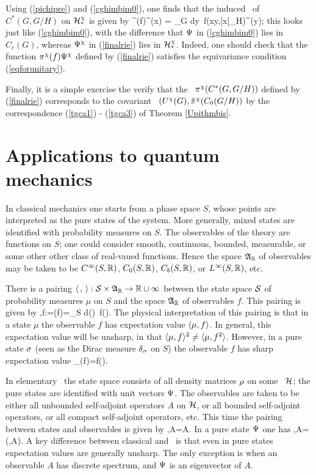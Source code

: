 Using (\ref{pichipre}) and (\ref{cghimbim0}), one finds that the induced \rep\ of
$C^*(G,G/H)$ on ${\cal H}_*^{\chi}$ is given by
\be
\pi^{\ch}(f)\Ps^{\ch}(x)  =  \int_G dy\, f(xy\inv,[x]_H)\Ps^{\ch}(y);  
 \ee
this looks just like (\ref{cghimbim0}), with the difference that $\Psi$ in 
(\ref{cghimbim0}) lies in $C_c(G)$, whereas $\Psi^{\chi}$ in (\ref{finalrie}) lies in
${\cal H}_*^{\chi}$. Indeed, one should check that the function $\pi^{\chi}(f)\Psi^{\chi}$ defined by
(\ref{finalrie})  satisfies the equivariance condition (\ref{eqforunitary}).

Finally, it is a simple exercise the verify that the \rep\ $\pi^{\chi}(C^*(G,G/H))$ defined
by (\ref{finalrie}) corresponds to the covariant \rep\ $(U^{\chi}(G),\tilde{\pi}^{\chi}(C_0(G/H))$
by the correspondence (\ref{tgca1}) - (\ref{tgca3}) of Theorem \ref{Upithmbis}.
\enp
\section{Applications to quantum mechanics}
  In classical mechanics one starts from a phase
space $S$, whose points are interpreted as the pure states of the
system. More generally, mixed states are identified with probability
measures on $S$. The observables of the theory are functions on $S$;
one could consider smooth, continuous, bounded, measurable, or some
other other class of real-vaued functions. Hence the space ${\frak A}_{\Bbb R}$ of
observables may be taken to be $C^{\infty}(S,{\Bbb R})$, $C_0(S,{\Bbb R})$, $C_b(S,{\Bbb R})$,
or $L^{\infty}(S,{\Bbb R})$, etc.

 There is a pairing $\langle\, ,\, \rangle:{\cal S}\times{\frak A}_{\Bbb R}\rightarrow{\Bbb R}\cup\infty$ between the state space ${\cal S}$ of
probability measures
$\mu$ on
$S$ and the space ${\frak A}_{\Bbb R}$ of observables $f$. This pairing is given by 
\be
\la\mu,f\ra:=\mu(f)=\int_S d\mu(\sg)\, f(\sg).
\ee
The physical interpretation of this pairing is that in a state $\mu$ the observable $f$ has
expectation value $\langle\mu,f\rangle$. In general, this expectation value will be unsharp, in that
$\langle\mu,f\rangle^2\neq \langle\mu,f^2\rangle$. However,
  in a pure state
$\sigma$ (seen as the Dirac measure
$\delta_{\sigma}$ on $S$) the observable $f$ has sharp expectation value 
\be
\dl_{\sg}(f)=f(\sg).
\ee

In elementary \qm\ the state space consists of all density matrices $\rho$ on some
\Hs\ ${\cal H}$; the pure states are identified with unit vectors $\Psi$. The observables are taken to be
either all unbounded self-adjoint operators
$A$ on
${\cal H}$, or all bounded self-adjoint operators, or all compact self-adjoint operators, etc.
This time the pairing between states and observables is given by
\be
\la\rh,A\ra=\Tr\rh A.
\ee
In a pure state $\Psi$ one has
\be
\la\Ps,A\ra=(\Ps,A\Ps).
\ee
A key difference between classical and \qm\ is that even in pure states expectation values are
generally unsharp. The only exception is when an observable $A$ has discrete spectrum, and $\Psi$
is an eigenvector of $A$. 

